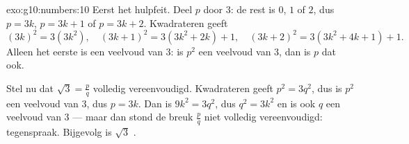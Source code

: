 \begin{solution}{exo:g10:numbers:10}
Eerst het hulpfeit. Deel $p$ door $3$: de rest is $0$, $1$ of $2$, dus
$p = 3k$, $p = 3k+1$ of $p = 3k+2$. Kwadrateren geeft
\[
(3k)^2 = 3(3k^2), \quad
(3k+1)^2 = 3(3k^2 + 2k) + 1, \quad
(3k+2)^2 = 3(3k^2 + 4k + 1) + 1 .
\]
Alleen het eerste is een veelvoud van $3$: is $p^2$ een veelvoud van $3$,
dan is $p$ dat ook.

Stel nu dat $\sqrt3 = \frac pq$ volledig vereenvoudigd. Kwadrateren geeft
$p^2 = 3q^2$, dus is $p^2$ een veelvoud van $3$, dus $p = 3k$. Dan is
$9k^2 = 3q^2$, dus $q^2 = 3k^2$ en is ook $q$ een veelvoud van $3$ --- maar
dan stond de breuk $\frac pq$ niet volledig vereenvoudigd: tegenspraak.
Bijgevolg is $\sqrt3$ .
\end{solution}

